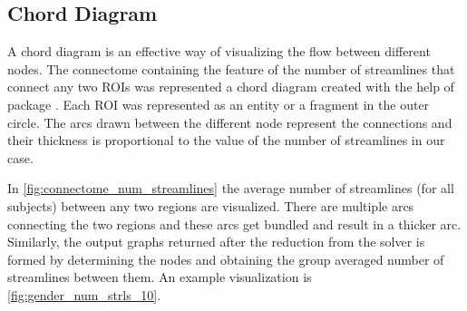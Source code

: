 \documentclass[msthesis.tex]{subfiles}
\begin{document}
\subsection{Chord Diagram}
A chord diagram is an effective way of visualizing the flow between different nodes. The connectome containing the feature of the number of streamlines that connect any two ROIs was represented a chord diagram created with the help of package \cite{stevens2015holoviews}. Each ROI was represented as an entity or a fragment in the outer circle. The arcs drawn between the different node represent the connections and their thickness is proportional to the value of the number of streamlines in our case. 

In \autoref{fig:connectome_num_streamlines} the average number of streamlines (for all subjects) between any two regions are visualized. There are multiple arcs connecting the two regions and these arcs get bundled and result in a thicker arc. Similarly, the output graphs returned after the reduction from the solver is formed by determining the nodes and obtaining the group averaged number of streamlines between them. An example visualization is \autoref{fig:gender_num_strls_10}.
\end{document}

